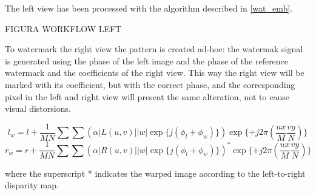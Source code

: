 The left view has been processed with the algorithm described in \ref{wat_emb}.\newline 




FIGURA WORKFLOW LEFT



To watermark the right view the pattern is created ad-hoc: the watermak signal is generated using the phase of the left image and the phase of the reference watermark and  the coefficients of the right view.\newline  
This way the right view will be marked with its coefficient, but with the correct phase, and the corresponding pixel in the left and right view will present the same alteration, not to cause visual distorsions.

$$ l_{w} = l + \frac{1}{MN}\sum\sum(\alpha|L(u,v)||w|\exp\{j(\phi_{l}+\phi_{w})\})\exp\{+j2\pi(\frac{ux}{M}\frac{vy}{N})\} $$
$$ r_{w} = r + \frac{1}{MN}\sum\sum(\alpha|R(u,v)||w|\exp\{j(\phi_{l}+\phi_{w})\})^{*}\exp\{+j2\pi(\frac{ux}{M}\frac{vy}{N})\} $$

where the superscript * indicates the warped image according to the left-to-right disparity map.

